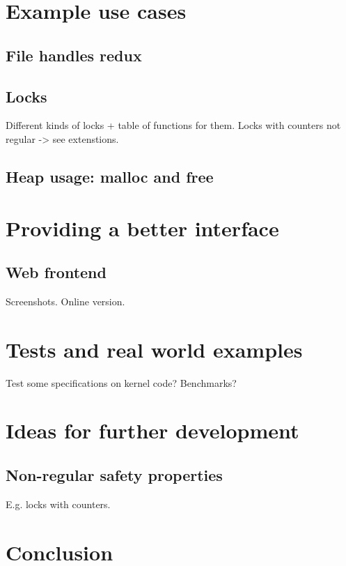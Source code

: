 \chapter{Example use cases}
\section{File handles redux}

\section{Locks}
Different kinds of locks + table of functions for them.
Locks with counters not regular -> see extenstions.

\section{Heap usage: malloc and free}


\chapter{Providing a better interface}
\section{Web frontend}
Screenshots.
Online version.


\chapter{Tests and real world examples}
Test some specifications on kernel code?
Benchmarks?


\chapter{Ideas for further development}
\section{Non-regular safety properties}
E.g. locks with counters.


\chapter{Conclusion}

